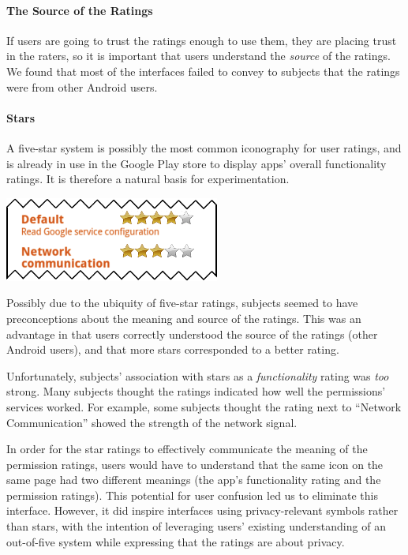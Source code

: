 \documentclass[11pt]{article}
\begin{document}
\paragraph{The Source of the Ratings}
\label{subsec-small-source}

If users are going to trust the ratings enough to use them, 
they are placing trust in the raters, so it is
important that users understand the \emph{source}
of the ratings. 
We found that most of the interfaces failed to
convey to subjects that the ratings were from other Android users.

\paragraph{Stars}
\label{s-sec-stars}

A five-star system is possibly the most common iconography for user ratings,
and is already in use in the Google Play store to display apps' overall 
functionality ratings. It is therefore a natural basis for experimentation.

\label{ss-sec-stars-r1}
\begin{center}
\includegraphics[width=.5\linewidth]{candidate-img/stars/starsR1.png}
\end{center}

Possibly due to the ubiquity of five-star ratings, 
subjects seemed to have preconceptions 
about the meaning and source of the ratings. This was an advantage 
in that users correctly understood the source of
the ratings (other Android users), and that more stars corresponded to a 
better rating.

Unfortunately, subjects' association with stars as a \emph{functionality} rating 
was \emph{too} strong. Many subjects thought the ratings indicated how well 
the permissions' services worked. For example, some subjects thought the rating next 
to ``Network Communication'' showed the strength of the network signal. 

In order for the star ratings to effectively communicate the meaning of the permission 
ratings, users would have to understand that the same icon
on the same page had two different meanings (the app's functionality
rating and the permission ratings). This potential for user confusion led
us to eliminate this interface.
However, it did inspire interfaces using privacy-relevant symbols rather than stars, with 
the intention of
leveraging users' existing understanding of an out-of-five system while
expressing that the ratings are about privacy.
\end{document}
